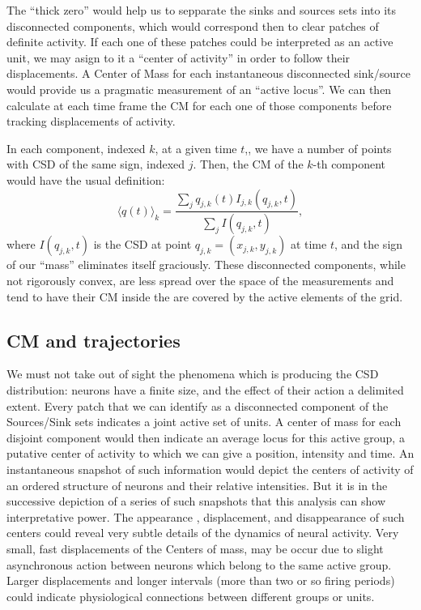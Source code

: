 \documentclass[12pt]{article}
\begin{document}
The ``thick zero'' would help us to sepparate the sinks and sources sets into
its disconnected components, which would correspond then to clear patches of
definite activity. If each one of these patches could be interpreted as an active unit,
we may asign to it a ``center of activity'' in order to follow their displacements.
A Center of Mass for each instantaneous disconnected sink/source would provide us
a pragmatic measurement of an ``active locus''. We can then calculate at each time
frame the CM for each one of those components before tracking displacements of activity.



In each component, indexed $k$, at a given time $t$,, we have a number of points
with CSD of the same sign, indexed $j$. Then, the CM of the $k$-th
component would have the usual definition:
\begin{equation}\label{cmparadisj}
   \langle q(t) \rangle_k =\frac{\sum_j q_{j,k} (t) I_{j,k} (q_{j,k},t)}
           {\sum_j I(q_{j,k},t)},
\end{equation}
where $I(q_{j,k},t)$ is the CSD at point $q_{j,k}=(x_{j,k}, y_{j,k})$ at time $t$, and the
sign of our ``mass'' eliminates itself graciously.
These disconnected components, while not rigorously convex,
are less spread over the space of the measurements
and tend to have their CM inside the are covered by the active elements
of the grid. 


\subsection{CM and trajectories}

We must not take out of sight the phenomena which is producing the CSD distribution:
neurons have a finite size, and the effect of their action a delimited extent.
Every patch that we can identify as a disconnected component of the Sources/Sink
sets indicates a  joint active set of units. A center of mass for each disjoint
component would then indicate an average locus for this active group, a putative center of activity to which we can give a position, intensity and time. An instantaneous snapshot of such information would depict the centers of activity of an ordered structure of neurons and their relative intensities. But it is in the successive depiction of a series of such snapshots that this analysis can show interpretative power. The appearance , displacement, and disappearance of such centers could reveal very subtle details of the dynamics of neural activity. Very small, fast displacements of the Centers of mass, may be occur due to slight asynchronous action between neurons which belong to the same active group.
Larger displacements and  longer intervals (more than two or so firing periods)
could indicate physiological connections between different groups or units.
\end{document}
